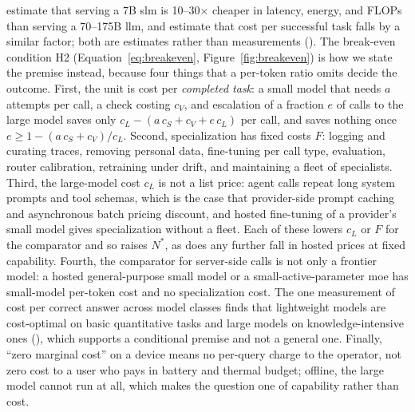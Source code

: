\citet{belcak2025slm_agentic} estimate that serving a 7B \gls{slm} is 10--30$\times$ cheaper in latency, energy, and FLOPs than serving a 70--175B \gls{llm}, and \citet{sharma2025slm_agentic} estimate that cost per successful task falls by a similar factor; both are estimates rather than measurements (\evD). The break-even condition H2 (Equation~\ref{eq:breakeven}, Figure~\ref{fig:breakeven}) is how we state the premise instead, because four things that a per-token ratio omits decide the outcome. First, the unit is cost per \emph{completed task}: a small model that needs $a$ attempts per call, a check costing $c_V$, and escalation of a fraction $e$ of calls to the large model saves only $c_L - (a\,c_S + c_V + e\,c_L)$ per call, and saves nothing once $e \ge 1 - (a\,c_S + c_V)/c_L$. Second, specialization has fixed costs $F$: logging and curating traces, removing personal data, fine-tuning per call type, evaluation, router calibration, retraining under drift, and maintaining a fleet of specialists. Third, the large-model cost $c_L$ is not a list price: agent calls repeat long system prompts and tool schemas, which is the case that provider-side prompt caching and asynchronous batch pricing discount, and hosted fine-tuning of a provider's small model gives specialization without a fleet. Each of these lowers $c_L$ or $F$ for the comparator and so raises $N^{*}$, as does any further fall in hosted prices at fixed capability. Fourth, the comparator for server-side calls is not only a frontier model: a hosted general-purpose small model or a small-active-parameter \gls{moe} has small-model per-token cost and no specialization cost. The one measurement of cost per correct answer across model classes finds that lightweight models are cost-optimal on basic quantitative tasks and large models on knowledge-intensive ones \citep{erol2025costofpass} (\evB), which supports a conditional premise and not a general one. Finally, ``zero marginal cost'' on a device means no per-query charge to the operator, not zero cost to a user who pays in battery and thermal budget; offline, the large model cannot run at all, which makes the question one of capability rather than cost.

